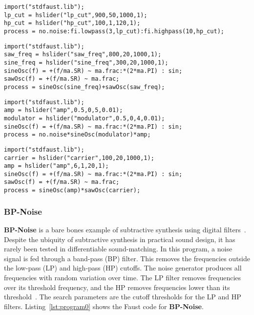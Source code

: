 \documentclass[lettersize,journal]{IEEEtran}
\newcommand{\BPNoise}{\textbf{BP-Noise}}
\newcommand{\AddSineSaw}{\textbf{Add-SineSaw}}
\newcommand{\AmpMod}{\textbf{Noise-AM}}
\newcommand{\FMMod}{\textbf{SineSaw-AM}}
\begin{document}
\begin{lstlisting}[caption={\BPNoise}, label={lst:program0}, language=Faust,
                  float, floatplacement=!H, xleftmargin=1em, xrightmargin=0.5em, firstnumber=0, aboveskip=0em, belowskip=-1em]
import("stdfaust.lib");
lp_cut = hslider("lp_cut",900,50,1000,1);
hp_cut = hslider("hp_cut",100,1,120,1);
process = no.noise:fi.lowpass(3,lp_cut):fi.highpass(10,hp_cut);
\end{lstlisting}

\begin{lstlisting}[caption={\AddSineSaw}, label={lst:program1},language=Faust,float,floatplacement=!H,xleftmargin=1em,xrightmargin=0.5em,firstnumber=0,aboveskip=0em, belowskip=-1em]
import("stdfaust.lib");
saw_freq = hslider("saw_freq",800,20,1000,1);
sine_freq = hslider("sine_freq",300,20,1000,1);
sineOsc(f) = +(f/ma.SR) ~ ma.frac:*(2*ma.PI) : sin;
sawOsc(f) = +(f/ma.SR) ~ ma.frac;
process = sineOsc(sine_freq)+sawOsc(saw_freq);
\end{lstlisting}

\begin{lstlisting}[caption={\AmpMod}, label={lst:program2},language=Faust,float,floatplacement=!H,xleftmargin=1em,xrightmargin=0.5em,firstnumber=0,aboveskip=0em, belowskip=-1em]
import("stdfaust.lib");
amp = hslider("amp",0.5,0,5,0.01);
modulator = hslider("modulator",0.5,0,4,0.01);
sineOsc(f) = +(f/ma.SR) ~ ma.frac:*(2*ma.PI) : sin;
process = no.noise*sineOsc(modulator)*amp;
\end{lstlisting}

\begin{lstlisting}[caption={\FMMod}, label={lst:program3},language=Faust,float,floatplacement=!H,xleftmargin=1em,xrightmargin=0.5em,firstnumber=0,aboveskip=0em, belowskip=-1em]
import("stdfaust.lib");
carrier = hslider("carrier",100,20,1000,1);
amp = hslider("amp",6,1,20,1);
sineOsc(f) = +(f/ma.SR) ~ ma.frac:*(2*ma.PI) : sin;
sawOsc(f) = +(f/ma.SR) ~ ma.frac;
process = sineOsc(amp)*sawOsc(carrier);
\end{lstlisting}

\subsubsection{\BPNoise}
\label{sec:program0}
\BPNoise{} is a bare bones example of subtractive synthesis using digital filters~\cite{smith2007introduction}. Despite the ubiquity of subtractive synthesis in practical sound design, it has rarely been tested in differentiable sound-matching. In this program, a noise signal is fed through a band-pass (BP) filter. This removes the frequencies outside the low-pass (LP) and high-pass (HP) cutoffs. The noise generator produces all frequencies with random variation over time. The LP filter removes frequencies over its threshold frequency, and the HP removes frequencies lower than its threshold~\cite{smith2007introduction}. The search parameters are the cutoff thresholds for the LP and HP filters. Listing~\ref{lst:program0} shows the Faust code for \BPNoise.
\end{document}
